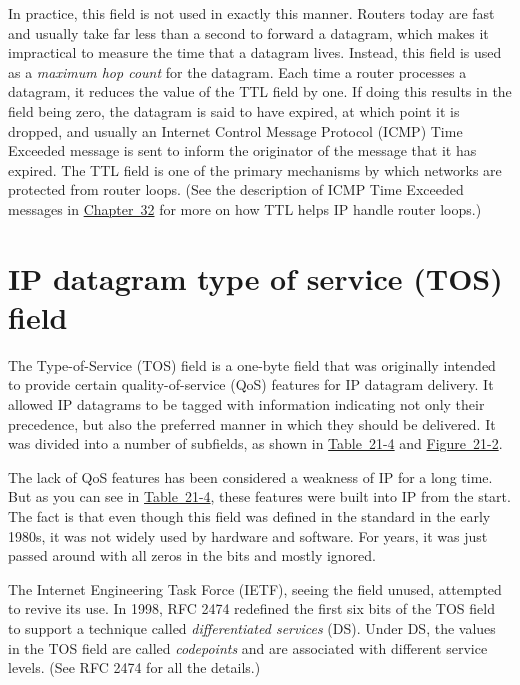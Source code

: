 In practice, this field is not used in exactly this manner. Routers
today are fast and usually take far less than a second to forward a
datagram, which makes it impractical to measure the time that a datagram
lives. Instead, this field is used as a \emph{maximum hop count} for the datagram.
Each time a router processes a datagram, it reduces the value of the TTL field by one.
If doing this results in the field being zero, the datagram is said to have expired, at which point it is dropped,
and usually an Internet Control Message Protocol (ICMP) Time Exceeded
message is sent to inform the originator of the message that it has expired.
The TTL field is one of the primary mechanisms by which networks are protected from router loops.
(See the description of ICMP Time Exceeded messages in \protect\hyperlink{ch32.html}{Chapter~32} for more on how TTL helps IP handle router loops.)





\section{IP datagram type of service (TOS) field}

The Type-of-Service (TOS) field is a one-byte field that was originally intended to provide certain quality-of-service (QoS) features for IP datagram delivery.
It allowed IP datagrams to be tagged with information indicating not only their precedence, but also the preferred manner in which they should be delivered.
It was divided into a number of subfields, as shown in
\protect\hyperlink{ch21s02.htmlux5cux23original_definition_of_ipv_type_of_servi}{Table~21-4}
and
\protect\hyperlink{ch21s02.htmlux5cux23ipv4_datagram_format_this_diagram_shows_}{Figure~21-2}.

The lack of QoS features has been considered a weakness of IP for a long
time. But as you can see in
\protect\hyperlink{ch21s02.htmlux5cux23original_definition_of_ipv_type_of_servi}{Table~21-4},
these features were built into IP from the start. The fact is that even
though this field was defined in the standard in the early 1980s, it was
not widely used by hardware and software. For years, it was just passed
around with all zeros in the bits and mostly ignored.

The Internet Engineering Task Force (IETF), seeing the field unused,
attempted to revive its use. In 1998, RFC 2474 redefined the first six
bits of the TOS field to support a technique called
\emph{differentiated services} (DS). Under DS, the values in the TOS field are called
\emph{codepoints} and are associated with different service levels.
(See RFC 2474 for all the details.)


